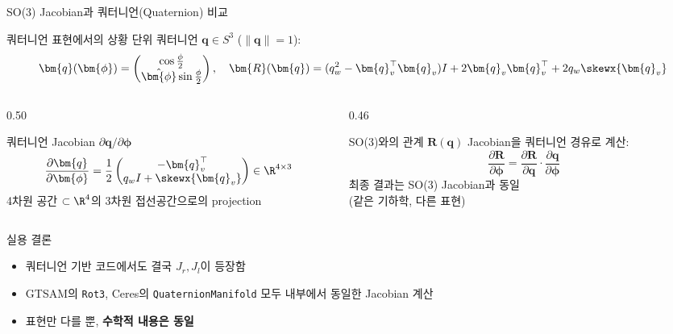 \begin{frame}[shrink=5]{SO(3) Jacobian과 쿼터니언(Quaternion) 비교}
  \begin{block}{쿼터니언 표현에서의 상황}
    단위 쿼터니언 $\bm{q} \in S^3$ ($\|\bm{q}\|=1$):
    \[
      \bm{q}(\bm{\phi}) = \begin{pmatrix}\cos\frac{\phi}{2} \\ \hat{\bm{\phi}}\sin\frac{\phi}{2}\end{pmatrix},
      \quad
      \bm{R}(\bm{q}) = (q_w^2 - \bm{q}_v^\top\bm{q}_v)I + 2\bm{q}_v\bm{q}_v^\top + 2q_w\skewx{\bm{q}_v}
    \]
  \end{block}
  \pause
  \begin{columns}[T]
    \begin{column}{0.50\textwidth}
      \begin{alertblock}{쿼터니언 Jacobian $\partial\bm{q}/\partial\bm{\phi}$}
        \[
          \frac{\partial\bm{q}}{\partial\bm{\phi}} = \frac{1}{2}
          \begin{pmatrix} -\bm{q}_v^\top \\ q_w I + \skewx{\bm{q}_v}\end{pmatrix}
          \in \R^{4\times 3}
        \]
        4차원 공간 $\subset \R^4$의 3차원 접선공간으로의 projection
      \end{alertblock}
    \end{column}
    \begin{column}{0.46\textwidth}
      \begin{block}{SO(3)와의 관계}
        $\bm{R}(\bm{q})$ Jacobian을 쿼터니언 경유로 계산:
        \[
          \frac{\partial\bm{R}}{\partial\bm{\phi}} = \frac{\partial\bm{R}}{\partial\bm{q}} \cdot \frac{\partial\bm{q}}{\partial\bm{\phi}}
        \]
        최종 결과는 SO(3) Jacobian과 동일\\
        (같은 기하학, 다른 표현)
      \end{block}
    \end{column}
  \end{columns}
  \pause
  \begin{exampleblock}{실용 결론}
    \begin{itemize}
      \item 쿼터니언 기반 코드에서도 결국 $J_r, J_l$이 등장함
      \item GTSAM의 \texttt{Rot3}, Ceres의 \texttt{QuaternionManifold} 모두 내부에서 동일한 Jacobian 계산
      \item 표현만 다를 뿐, \textbf{수학적 내용은 동일}
    \end{itemize}
  \end{exampleblock}
\end{frame}



